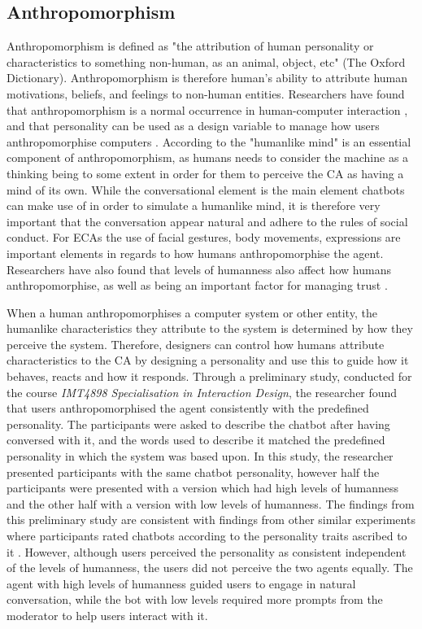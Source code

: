 \subsection{Anthropomorphism}
Anthropomorphism is defined as "the attribution of human personality or characteristics to something non-human, as an animal, object, etc" (The Oxford Dictionary). Anthropomorphism is therefore human's ability to attribute human motivations, beliefs, and feelings to non-human entities. Researchers have found that anthropomorphism is a normal occurrence in human-computer interaction \citep{Reeves1996,Cohen2004,Pearl2017,Lee2010}, and that personality can be used as a design variable to manage how users anthropomorphise computers \citep{Xiao2005}. According to \cite{Schroeder2016} the "humanlike mind" is an essential component of anthropomorphism, as humans needs to consider the machine as a thinking being to some extent in order for them to perceive the CA as having a mind of its own. While the conversational element is the main element chatbots can make use of in order to simulate a humanlike mind, it is therefore very important that the conversation appear natural and adhere to the rules of social conduct. For ECAs the use of facial gestures, body movements, expressions are important elements in regards to how humans anthropomorphise the agent. Researchers have also found that levels of humanness also affect how humans anthropomorphise, as well as being an important factor for managing trust \citep{Prada2003,Meyer2016,Dautenhahn2002,Terada2015,Epley2007,Lee2004}.

When a human anthropomorphises a computer system or other entity, the humanlike characteristics they attribute to the system is determined by how they perceive the system. Therefore, designers can control how humans attribute characteristics to the CA by designing a personality and use this to guide how it behaves, reacts and how it responds. Through a preliminary study, conducted for the course \textit{IMT4898 Specialisation in Interaction Design}, the researcher found that users anthropomorphised the agent consistently with the predefined personality. The participants were asked to describe the chatbot after having conversed with it, and the words used to describe it matched the predefined personality in which the system was based upon. In this study, the researcher presented participants with the same chatbot personality, however half the participants were presented with a version which had high levels of humanness and the other half with a version with low levels of humanness. The findings from this preliminary study are consistent with findings from other similar experiments where participants rated chatbots according to the personality traits ascribed to it \citep{Holtgraves2007}. However, although users perceived the personality as consistent independent of the levels of humanness, the users did not perceive the two agents equally. The agent with high levels of humanness guided users to engage in natural conversation, while the bot with low levels required more prompts from the moderator to help users interact with it.

